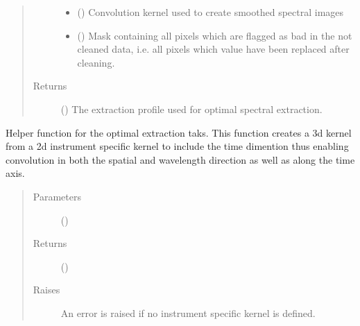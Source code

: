 \documentclass[a4paper,10pt,english]{sphinxmanual}
\begin{document}
\begin{fulllineitems}
\begin{fulllineitems}
\begin{quote}
\begin{description}
\begin{itemize}
\item {} 
 () \textendash{} Convolution kernel used to create smoothed spectral images

\item {} 
 () \textendash{} Mask containing all pixels which are flagged as bad in the not
cleaned data, i.e. all pixels which value have been replaced
after cleaning.

\end{itemize}

\item[{Returns}] \leavevmode
{} () \textendash{} The extraction profile used for optimal spectral extraction.

\end{description}\end{quote}

\end{fulllineitems}


\begin{fulllineitems}
\label{\detokenize{cascade.TSO:cascade.TSO.TSO.TSOSuite._create_3dKernel}}
Helper function for the optimal extraction taks. This function
creates a 3d kernel from a 2d instrument specific kernel
to include the time dimention thus enabling convolution in both the
spatial and wavelength direction as well as along the time axis.
\begin{quote}\begin{description}
\item[{Parameters}] \leavevmode
{} () \textendash{} 

\item[{Returns}] \leavevmode
{} ()

\item[{Raises}] \leavevmode
{} \textendash{} An error is raised if no instrument specific kernel is defined.


\end{description}
\end{quote}
\end{fulllineitems}
\end{fulllineitems}
\end{document}
